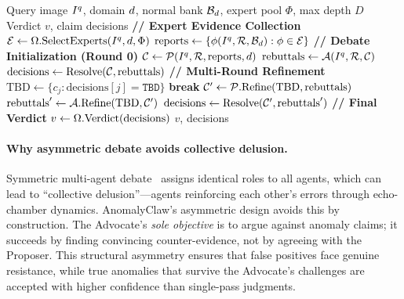 \begin{algorithm}[t]
\caption{AnomalyClaw adversarial debate}
\label{alg:debate}
\begin{algorithmic}[1]
\REQUIRE Query image $I^q$, domain $d$, normal bank $\mathcal{B}_d$, expert pool $\Phi$, max depth $D$
\ENSURE Verdict $v$, claim decisions
\STATE \textbf{// Expert Evidence Collection}
\STATE $\mathcal{E} \gets \Omega.\text{SelectExperts}(I^q, d, \Phi)$ \hfill{}
\STATE $\text{reports} \gets \{\phi(I^q, \mathcal{R}, \mathcal{B}_d) : \phi \in \mathcal{E}\}$
\STATE \textbf{// Debate Initialization (Round 0)}
\STATE $\mathcal{C} \gets \mathcal{P}(I^q, \mathcal{R}, \text{reports}, d)$ \hfill{}
\STATE $\text{rebuttals} \gets \mathcal{A}(I^q, \mathcal{R}, \mathcal{C})$ \hfill{}
\STATE $\text{decisions} \gets \text{Resolve}(\mathcal{C}, \text{rebuttals})$ \hfill{}
\STATE \textbf{// Multi-Round Refinement}
    \STATE $\text{TBD} \gets \{c_j : \text{decisions}[j] = \texttt{TBD}\}$
        \STATE \textbf{break} \hfill{}
    \ENDIF
    \STATE $\mathcal{C}' \gets \mathcal{P}.\text{Refine}(\text{TBD}, \text{rebuttals})$
    \STATE $\text{rebuttals}' \gets \mathcal{A}.\text{Refine}(\text{TBD}, \mathcal{C}')$
    \STATE $\text{decisions} \gets \text{Resolve}(\mathcal{C}', \text{rebuttals}')$
\ENDFOR
\STATE \textbf{// Final Verdict}
\STATE $v \gets \Omega.\text{Verdict}(\text{decisions})$
\RETURN $v$, decisions
\end{algorithmic}
\end{algorithm}

\paragraph{Why asymmetric debate avoids collective delusion.}
Symmetric multi-agent debate~\citep{li2025dmad,liang2026m3mad} assigns identical roles to all agents, which can lead to ``collective delusion''---agents reinforcing each other's errors through echo-chamber dynamics.
AnomalyClaw's asymmetric design avoids this by construction.
The Advocate's \emph{sole objective} is to argue against anomaly claims; it succeeds by finding convincing counter-evidence, not by agreeing with the Proposer.
This structural asymmetry ensures that false positives face genuine resistance, while true anomalies that survive the Advocate's challenges are accepted with higher confidence than single-pass judgments.

